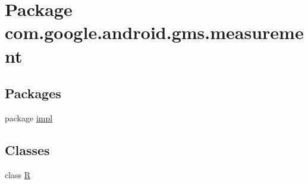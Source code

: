 \hypertarget{namespacecom_1_1google_1_1android_1_1gms_1_1measurement}{}\section{Package com.\+google.\+android.\+gms.\+measurement}
\label{namespacecom_1_1google_1_1android_1_1gms_1_1measurement}
\subsection*{Packages}
\begin{DoxyCompactItemize}
\item 
package \mbox{\hyperlink{namespacecom_1_1google_1_1android_1_1gms_1_1measurement_1_1impl}{impl}}
\end{DoxyCompactItemize}
\subsection*{Classes}
\begin{DoxyCompactItemize}
\item 
class \mbox{\hyperlink{classcom_1_1google_1_1android_1_1gms_1_1measurement_1_1R}{R}}
\end{DoxyCompactItemize}
